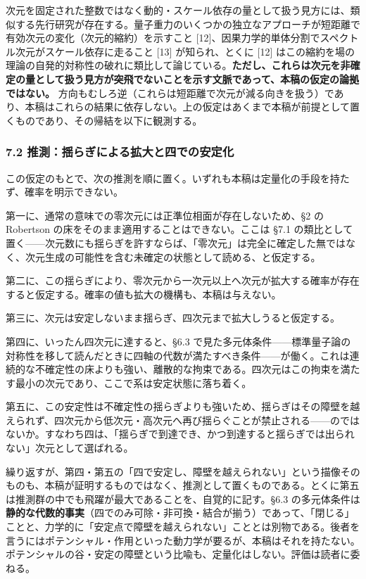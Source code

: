 \documentclass[
]{ltjsarticle}
\begin{document}
次元を固定された整数ではなく動的・スケール依存の量として扱う見方には、類似する先行研究が存在する。量子重力のいくつかの独立なアプローチが短距離で有効次元の変化（次元的縮約）を示すこと
{[}12{]}、因果力学的単体分割でスペクトル次元がスケール依存に走ること
{[}13{]} が知られ、とくに {[}12{]}
はこの縮約を場の理論の自発的対称性の破れに類比して論じている。\textbf{ただし、これらは次元を非確定の量として扱う見方が突飛でないことを示す文脈であって、本稿の仮定の論拠ではない。}
方向もむしろ逆（これらは短距離で次元が減る向きを扱う）であり、本稿はこれらの結果に依存しない。上の仮定はあくまで本稿が前提として置くものであり、その帰結を以下に観測する。

\subsubsection{7.2
推測：揺らぎによる拡大と四での安定化}\label{ux63a8ux6e2cux63faux3089ux304eux306bux3088ux308bux62e1ux5927ux3068ux56dbux3067ux306eux5b89ux5b9aux5316}

この仮定のもとで、次の推測を順に置く。いずれも本稿は定量化の手段を持たず、確率を明示できない。

第一に、通常の意味での零次元には正準位相面が存在しないため、§2 の
Robertson の床をそのまま適用することはできない。ここは §7.1
の類比として置く------次元数にも揺らぎを許すならば、「零次元」は完全に確定した無ではなく、次元生成の可能性を含む未確定の状態として読める、と仮定する。

第二に、この揺らぎにより、零次元から一次元以上へ次元が拡大する確率が存在すると仮定する。確率の値も拡大の機構も、本稿は与えない。

第三に、次元は安定しないまま揺らぎ、四次元まで拡大しうると仮定する。

第四に、いったん四次元に達すると、§6.3
で見た多元体条件------標準量子論の対称性を移して読んだときに四軸の代数が満たすべき条件------が働く。これは連続的な不確定性の床よりも強い、離散的な拘束である。四次元はこの拘束を満たす最小の次元であり、ここで系は安定状態に落ち着く。

第五に、この安定性は不確定性の揺らぎよりも強いため、揺らぎはその障壁を越えられず、四次元から低次元・高次元へ再び揺らぐことが禁止される------のではないか。すなわち四は、「揺らぎで到達でき、かつ到達すると揺らぎでは出られない」次元として選ばれる。

繰り返すが、第四・第五の「四で安定し、障壁を越えられない」という描像そのものも、本稿が証明するものではなく、推測として置くものである。とくに第五は推測群の中でも飛躍が最大であることを、自覚的に記す。§6.3
の多元体条件は\textbf{静的な代数的事実}（四でのみ可除・非可換・結合が揃う）であって、「閉じる」ことと、力学的に「安定点で障壁を越えられない」こととは別物である。後者を言うにはポテンシャル・作用といった動力学が要るが、本稿はそれを持たない。ポテンシャルの谷・安定の障壁という比喩も、定量化はしない。評価は読者に委ねる。
\end{document}
